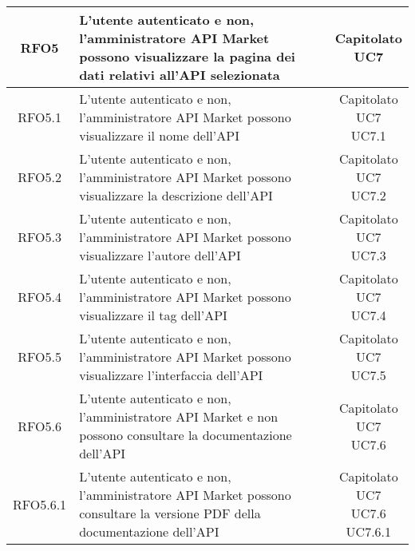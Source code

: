 \begin{longtable}{|c|p{8cm}|c|}
\hypertarget{RFO5}{RFO5} & L'utente autenticato e non, l'amministratore API Market possono visualizzare la pagina dei dati relativi all'API selezionata & \makecell*{Capitolato\\UC7} \\
\hline

\hypertarget{RFO5.1}{RFO5.1} & L'utente autenticato e non, l'amministratore API Market possono visualizzare il nome dell'API & \makecell*{Capitolato\\UC7\\UC7.1} \\
\hline

\hypertarget{RFO5.2}{RFO5.2} & L'utente autenticato e non, l'amministratore API Market possono visualizzare la descrizione dell'API & \makecell*{Capitolato\\UC7\\UC7.2} \\
\hline

\hypertarget{RFO5.3}{RFO5.3} & L'utente autenticato e non, l'amministratore API Market possono visualizzare l'autore dell'API & \makecell*{Capitolato\\UC7\\UC7.3} \\
\hline

\hypertarget{RFO5.4}{RFO5.4} & L'utente autenticato e non, l'amministratore API Market possono visualizzare il tag dell'API & \makecell*{Capitolato\\UC7\\UC7.4} \\
\hline

\hypertarget{RFO5.5}{RFO5.5} & L'utente autenticato e non, l'amministratore API Market possono visualizzare l'interfaccia dell'API & \makecell*{Capitolato\\UC7\\UC7.5} \\
\hline

\hypertarget{RFO5.6}{RFO5.6} & L'utente autenticato e non, l'amministratore API Market e non possono consultare la documentazione dell'API & \makecell*{Capitolato\\UC7\\UC7.6} \\
\hline

\hypertarget{RFO5.6.1}{RFO5.6.1} & L'utente autenticato e non, l'amministratore API Market possono consultare la versione PDF della documentazione dell'API & \makecell*{Capitolato\\UC7\\UC7.6\\UC7.6.1} \\
\hline


\end{longtable}
